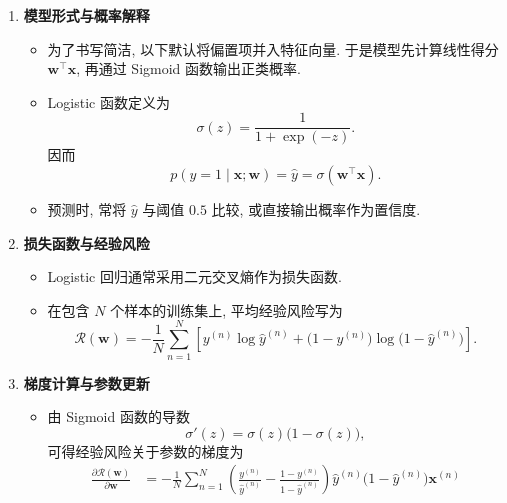 \documentclass{../nndlcourse}
\begin{document}
\begin{enumerate}
    \item \textbf{模型形式与概率解释}
    \begin{itemize}
        \item 为了书写简洁, 以下默认将偏置项并入特征向量. 于是模型先计算线性得分 $\boldsymbol{w}^\top \boldsymbol{x}$, 再通过 Sigmoid 函数输出正类概率.
        \item Logistic 函数定义为
        \begin{equation*}
            \sigma(z) = \frac{1}{1 + \exp(-z)}.
        \end{equation*}
        因而
        \begin{equation*}
            p(y = 1 \mid \boldsymbol{x}; \boldsymbol{w}) = \hat{y} = \sigma(\boldsymbol{w}^\top \boldsymbol{x}).
        \end{equation*}
        \item 预测时, 常将 $\hat{y}$ 与阈值 $0.5$ 比较, 或直接输出概率作为置信度.
    \end{itemize}
    \item \textbf{损失函数与经验风险}
    \begin{itemize}
        \item Logistic 回归通常采用二元交叉熵作为损失函数.
        \item 在包含 $N$ 个样本的训练集上, 平均经验风险写为
        \begin{equation*}
            \mathcal{R}(\boldsymbol{w}) = -\frac{1}{N} \sum_{n=1}^N \left[
                y^{(n)} \log \hat{y}^{(n)} + \bigl(1 - y^{(n)}\bigr) \log \bigl(1 - \hat{y}^{(n)}\bigr)
            \right].
        \end{equation*}
    \end{itemize}
    \item \textbf{梯度计算与参数更新}
    \begin{itemize}
        \item 由 Sigmoid 函数的导数
        \begin{equation*}
            \sigma'(z) = \sigma(z)\bigl(1 - \sigma(z)\bigr),
        \end{equation*}
        可得经验风险关于参数的梯度为
        \begin{align*}
            \frac{\partial \mathcal{R}(\boldsymbol{w})}{\partial \boldsymbol{w}}
            &= -\frac{1}{N} \sum_{n=1}^N \left(
                \frac{y^{(n)}}{\hat{y}^{(n)}} - \frac{1 - y^{(n)}}{1 - \hat{y}^{(n)}}
            \right) \hat{y}^{(n)}\bigl(1 - \hat{y}^{(n)}\bigr) \boldsymbol{x}^{(n)} \\

\end{align*}
\end{itemize}
\end{enumerate}
\end{document}
